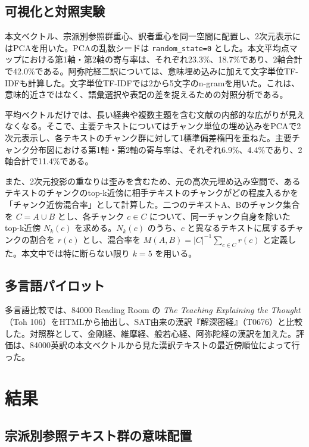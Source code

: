 \documentclass[uplatex,dvipdfmx,11pt,a4paper]{jsarticle}
\begin{document}
\subsection{可視化と対照実験}

本文ベクトル、宗派別参照群重心、訳者重心を同一空間に配置し、2次元表示にはPCAを用いた。PCAの乱数シードは \texttt{random\_state=0} とした。本文平均点マップにおける第1軸・第2軸の寄与率は、それぞれ23.3\%、18.7\%であり、2軸合計で42.0\%である。阿弥陀経二訳については、意味埋め込みに加えて文字単位TF-IDFも計算した。文字単位TF-IDFでは2から5文字のn-gramを用いた。これは、意味的近さではなく、語彙選択や表記の差を捉えるための対照分析である。

平均ベクトルだけでは、長い経典や複数主題を含む文献の内部的な広がりが見えなくなる。そこで、主要テキストについてはチャンク単位の埋め込みをPCAで2次元表示し、各テキストのチャンク群に対して1標準偏差楕円を重ねた。主要チャンク分布図における第1軸・第2軸の寄与率は、それぞれ6.9\%、4.4\%であり、2軸合計で11.4\%である。

また、2次元投影の重なりは歪みを含むため、元の高次元埋め込み空間で、あるテキストのチャンクのtop-k近傍に相手テキストのチャンクがどの程度入るかを「チャンク近傍混合率」として計算した。二つのテキストA、Bのチャンク集合を $C=A\cup B$ とし、各チャンク $c\in C$ について、同一チャンク自身を除いたtop-k近傍 $N_k(c)$ を求める。$N_k(c)$ のうち、$c$ と異なるテキストに属するチャンクの割合を $r(c)$ とし、混合率を $M(A,B)=|C|^{-1}\sum_{c\in C} r(c)$ と定義した。本文中では特に断らない限り $k=5$ を用いる。

\subsection{多言語パイロット}

多言語比較では、84000 Reading Room の \textit{The Teaching Explaining the Thought}（Toh 106）をHTMLから抽出し、SAT由来の漢訳『解深密経』（T0676）と比較した。対照群として、金剛経、維摩経、般若心経、阿弥陀経の漢訳を加えた。評価は、84000英訳の本文ベクトルから見た漢訳テキストの最近傍順位によって行った。

\section{結果}

\subsection{宗派別参照テキスト群の意味配置}
\end{document}
